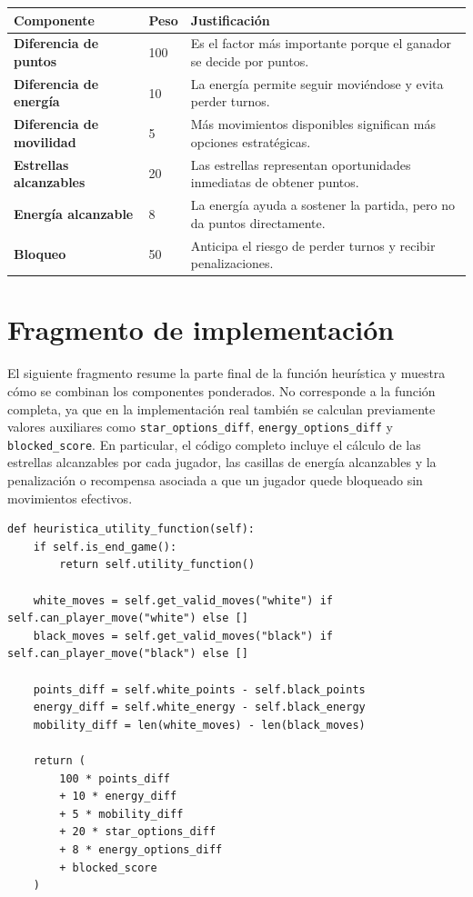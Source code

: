 \documentclass[12pt,letterpaper]{article}
\begin{document}
\begin{center}
\begin{tabular}{>{\bfseries}p{4.2cm}p{2.2cm}p{8cm}}
\toprule
Componente & Peso & Justificación\\
\midrule
Diferencia de puntos & 100 & Es el factor más importante porque el ganador se decide por puntos.\\
Diferencia de energía & 10 & La energía permite seguir moviéndose y evita perder turnos.\\
Diferencia de movilidad & 5 & Más movimientos disponibles significan más opciones estratégicas.\\
Estrellas alcanzables & 20 & Las estrellas representan oportunidades inmediatas de obtener puntos.\\
Energía alcanzable & 8 & La energía ayuda a sostener la partida, pero no da puntos directamente.\\
Bloqueo & 50 & Anticipa el riesgo de perder turnos y recibir penalizaciones.\\
\bottomrule
\end{tabular}
\end{center}

\section{Fragmento de implementación}

El siguiente fragmento resume la parte final de la función heurística y muestra cómo se combinan los componentes ponderados. No corresponde a la función completa, ya que en la implementación real también se calculan previamente valores auxiliares como \texttt{star\_options\_diff}, \texttt{energy\_options\_diff} y \texttt{blocked\_score}. En particular, el código completo incluye el cálculo de las estrellas alcanzables por cada jugador, las casillas de energía alcanzables y la penalización o recompensa asociada a que un jugador quede bloqueado sin movimientos efectivos.

\begin{lstlisting}[style=kePython]
def heuristica_utility_function(self):
    if self.is_end_game():
        return self.utility_function()

    white_moves = self.get_valid_moves("white") if self.can_player_move("white") else []
    black_moves = self.get_valid_moves("black") if self.can_player_move("black") else []

    points_diff = self.white_points - self.black_points
    energy_diff = self.white_energy - self.black_energy
    mobility_diff = len(white_moves) - len(black_moves)

    return (
        100 * points_diff
        + 10 * energy_diff
        + 5 * mobility_diff
        + 20 * star_options_diff
        + 8 * energy_options_diff
        + blocked_score
    )
\end{lstlisting}
\end{document}
